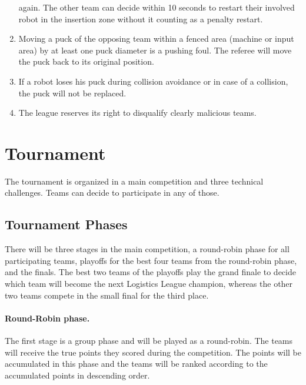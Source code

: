 \documentclass[12pt,twoside]{article}
\begin{document}
\begin{enumerate}
  again. The other team can decide within 10 seconds to restart their
  involved robot in the insertion zone without it counting as a
  penalty restart.
\item Moving a puck of the opposing team within a fenced area (machine
  or input area) by at least one puck diameter is a pushing foul. The
  referee will move the puck back to its original position.
\item If a robot loses his puck during collision avoidance or in case
  of a collision, the puck will not be replaced.
\item The league reserves its right to disqualify clearly malicious
  teams.
\end{enumerate}

\section{Tournament}
\label{sec:tournament}
The tournament is organized in a main competition and three technical
challenges. Teams can decide to participate in any of those.

\subsection{Tournament Phases}
\label{sec:tournament-phases}
There will be three stages in the main competition, a round-robin
phase for all participating teams, playoffs for the best four teams
from the round-robin phase, and the finals. The best two teams of the
playoffs play the grand finale to decide which team will become the
next Logistics League champion, whereas the other two teams compete in
the small final for the third place.

\paragraph{Round-Robin phase.~} 
The first stage is a group phase and will be played as a round-robin.
The teams will receive the true points they scored during the
competition. The points will be accumulated in this phase and the
teams will be ranked according to the accumulated points in descending
order.
\end{document}
